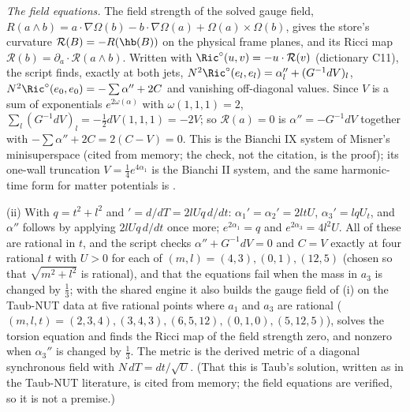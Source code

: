 \emph{The field equations.} The field strength of the solved gauge field, $R(a\wedge b) = a\cdot\nabla\Omega(b) - b\cdot\nabla\Omega(a) + \Omega(a)\times\Omega(b)$, gives the store's curvature $\mathcal{R}(B) = -R(\hb(B))$ on the physical frame planes, and its Ricci map $\mathcal{R}(b) = \partial_{a}\cdot\mathcal{R}(a\wedge b)$. Written with $\Ric^{\circ}(u, v) = -u\cdot\mathcal{R}(v)$ (dictionary C11), the script finds, exactly at both jets, $N^{2}\Ric^{\circ}(e_{l}, e_{l}) = \alpha_{l}'' + (G^{-1}dV)_{l}$, $N^{2}\Ric^{\circ}(e_{0}, e_{0}) = -\sum\alpha'' + 2C$ and vanishing off-diagonal values. Since $V$ is a sum of exponentials $e^{2\omega(\alpha)}$ with $\omega(1, 1, 1) = 2$, $\sum_{l}(G^{-1}dV)_{l} = -\tfrac12 dV(1, 1, 1) = -2V$; so $\mathcal{R}(a) = 0$ is $\alpha'' = -G^{-1}dV$ together with $-\sum\alpha'' + 2C = 2(C - V) = 0$. This is the Bianchi IX system of Misner's minisuperspace (cited from memory; the check, not the citation, is the proof); its one-wall truncation $V = \tfrac14e^{4\alpha_{1}}$ is the Bianchi II system, and the same harmonic-time form for matter potentials is .

(ii) With $q = t^{2} + l^{2}$ and $' = d/dT = 2lUq\,d/dt$: $\alpha_{1}' = \alpha_{2}' = 2ltU$, $\alpha_{3}' = lqU_{t}$, and $\alpha''$ follows by applying $2lUq\,d/dt$ once more; $e^{2\alpha_{1}} = q$ and $e^{2\alpha_{3}} = 4l^{2}U$. All of these are rational in $t$, and the script checks $\alpha'' + G^{-1}dV = 0$ and $C = V$ exactly at four rational $t$ with $U > 0$ for each of $(m, l) = (4, 3), (0, 1), (12, 5)$ (chosen so that $\sqrt{m^{2} + l^{2}}$ is rational), and that the equations fail when the mass in $a_{3}$ is changed by $\tfrac13$; with the shared engine it also builds the gauge field of (i) on the Taub-NUT data at five rational points where $a_{1}$ and $a_{3}$ are rational ($(m, l, t) = (2, 3, 4), (3, 4, 3), (6, 5, 12), (0, 1, 0), (5, 12, 5)$), solves the torsion equation and finds the Ricci map of the field strength zero, and nonzero when $\alpha_{3}''$ is changed by $\tfrac13$. The metric is the derived metric of a diagonal synchronous field with $N\,dT = dt/\sqrt U$. (That this is Taub's solution, written as in the Taub-NUT literature, is cited from memory; the field equations are verified, so it is not a premise.)

